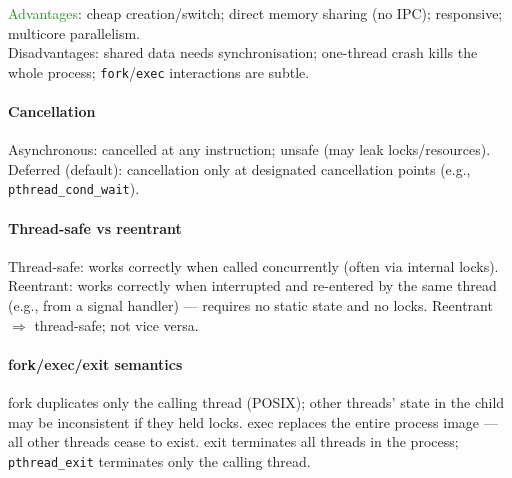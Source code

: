 \textcolor{ForestGreen}{Advantages}: cheap creation/switch; direct memory sharing (no IPC); responsive; multicore parallelism.\\
\textcolor{Bittersweet}{Disadvantages}: shared data needs synchronisation; one-thread crash kills the whole process; \texttt{fork}/\texttt{exec} interactions are subtle.

\paragraph{Cancellation}
\textcolor{Bittersweet}{Asynchronous}: cancelled at any instruction; unsafe (may leak locks/resources).
\textcolor{Bittersweet}{Deferred} (default): cancellation only at designated cancellation points (e.g., \texttt{pthread\_cond\_wait}).

\paragraph{Thread-safe vs reentrant}
\textcolor{Bittersweet}{Thread-safe}: works correctly when called concurrently (often via internal locks).
\textcolor{Bittersweet}{Reentrant}: works correctly when interrupted and re-entered by the same thread (e.g., from a signal handler) — requires no static state and no locks. Reentrant $\Rightarrow$ thread-safe; not vice versa.

\paragraph{fork/exec/exit semantics}
\textcolor{Bittersweet}{fork} duplicates only the calling thread (POSIX); other threads' state in the child may be inconsistent if they held locks. \textcolor{Bittersweet}{exec} replaces the entire process image — all other threads cease to exist. \textcolor{Bittersweet}{exit} terminates all threads in the process; \texttt{pthread\_exit} terminates only the calling thread.
